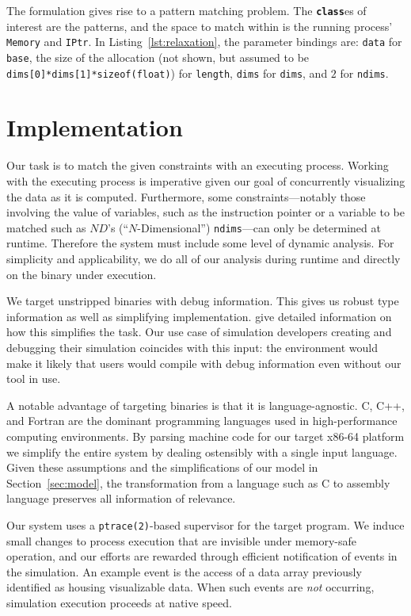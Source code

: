The formulation gives rise to a pattern matching problem.  The
\texttt{\textbf{class}}es of interest are the patterns, and the space
to match within is the running process' \texttt{Memory} and
\texttt{IPtr}.  In Listing~\ref{lst:relaxation}, the parameter bindings are:
\texttt{data} for \texttt{base}, the size of the allocation (not shown, but
assumed to be \texttt{dims[0]*dims[1]*sizeof(float)}) for
\texttt{length}, \texttt{dims} for \texttt{dims}, and $2$ for
\texttt{ndims}.

\section{Implementation}

Our task is to match the given constraints with an executing process.
Working with the executing process is imperative given our goal of
concurrently visualizing the data as it is computed.  Furthermore, some
constraints---notably those involving the value of variables, such as
the instruction pointer or a variable to be matched such as $ND$'s
(``$N$-Dimensional'')
\texttt{ndims}---can only be determined at runtime.  Therefore the
system must include some level of dynamic analysis.  For simplicity and
applicability, we do all of our analysis during runtime and directly on
the binary under execution.

We target unstripped binaries with debug information.  This gives us
robust type information as well as simplifying implementation.
\cite{Reps:2010:Bottom} give detailed information on how this
simplifies the task. Our use case of simulation developers creating and
debugging their simulation coincides with this input: the environment
would make it likely that users would compile with debug information
even without our tool in use.

A notable advantage of targeting binaries is that it is
language-agnostic.  C, C++, and Fortran are the dominant programming
languages used in high-performance computing environments.  By parsing
machine code for our target x86-64 platform we simplify the entire
system by dealing ostensibly with a single input language.  %
Given these assumptions and the simplifications of our model in
Section~\ref{sec:model}, the transformation from a language such
as C to assembly language preserves all information of relevance.

Our system uses a \texttt{ptrace(2)}-based supervisor for the target
program.  We induce small changes to process execution that are
invisible under memory-safe operation, and our efforts are rewarded
through efficient notification of events in the simulation.  An example
event is the access of a data array previously identified as housing
visualizable data.
When such events are \emph{not} occurring, simulation execution
proceeds at native speed.

